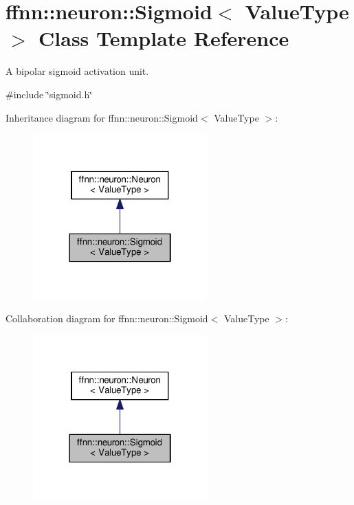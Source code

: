 \hypertarget{classffnn_1_1neuron_1_1_sigmoid}{\section{ffnn\-:\-:neuron\-:\-:Sigmoid$<$ Value\-Type $>$ Class Template Reference}
\label{classffnn_1_1neuron_1_1_sigmoid}
}


A bipolar sigmoid activation unit.  




{\ttfamily \#include \char`\"{}sigmoid.\-h\char`\"{}}



Inheritance diagram for ffnn\-:\-:neuron\-:\-:Sigmoid$<$ Value\-Type $>$\-:\nopagebreak
\begin{figure}[H]
\begin{center}
\leavevmode
\includegraphics[width=190pt]{classffnn_1_1neuron_1_1_sigmoid__inherit__graph}
\end{center}
\end{figure}


Collaboration diagram for ffnn\-:\-:neuron\-:\-:Sigmoid$<$ Value\-Type $>$\-:\nopagebreak
\begin{figure}[H]
\begin{center}
\leavevmode
\includegraphics[width=190pt]{classffnn_1_1neuron_1_1_sigmoid__coll__graph}
\end{center}
\end{figure}
